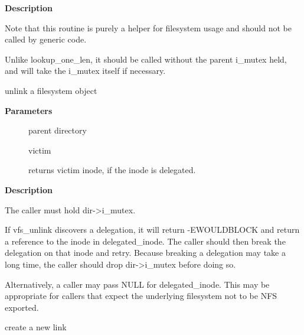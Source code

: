 \documentclass[a4paper,8pt,english]{sphinxmanual}
\begin{document}
\textbf{Description}

Note that this routine is purely a helper for filesystem usage and should
not be called by generic code.

Unlike lookup\_one\_len, it should be called without the parent
i\_mutex held, and will take the i\_mutex itself if necessary.

\begin{fulllineitems}
\label{filesystems/index:c.vfs_unlink}
unlink a filesystem object

\end{fulllineitems}


\textbf{Parameters}
\begin{description}
\item[{}] \leavevmode
parent directory

\item[{}] \leavevmode
victim

\item[{}] \leavevmode
returns victim inode, if the inode is delegated.

\end{description}

\textbf{Description}

The caller must hold dir-\textgreater{}i\_mutex.

If vfs\_unlink discovers a delegation, it will return -EWOULDBLOCK and
return a reference to the inode in delegated\_inode.  The caller
should then break the delegation on that inode and retry.  Because
breaking a delegation may take a long time, the caller should drop
dir-\textgreater{}i\_mutex before doing so.

Alternatively, a caller may pass NULL for delegated\_inode.  This may
be appropriate for callers that expect the underlying filesystem not
to be NFS exported.

\begin{fulllineitems}
\label{filesystems/index:c.vfs_link}
create a new link

\end{fulllineitems}
\end{document}
